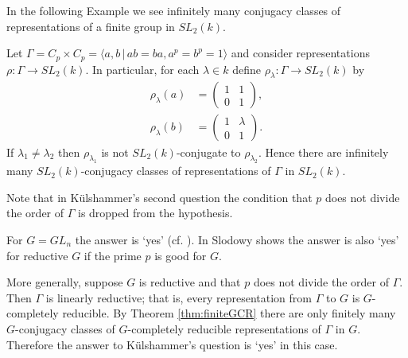 In the following Example we see infinitely many conjugacy classes of representations of a finite group in $SL_2(k)$.
\begin{example}
  Let $\Gamma = C_p \times C_p = \langle a, b \,|\, ab = ba, a^p = b^p = 1 \rangle$ and consider representations $\rho: \Gamma \rightarrow SL_2(k)$. In particular, for each $\lambda \in k$ define $\rho_\lambda: \Gamma \rightarrow SL_2(k)$ by
  \begin{align*}
    \rho_\lambda(a) &= \left( \begin{matrix} 1 & 1 \\ 0 & 1 \end{matrix} \right),\\
    \rho_\lambda(b) &= \left( \begin{matrix} 1 & \lambda \\ 0 & 1 \end{matrix} \right).
  \end{align*}
  If $\lambda_1 \neq \lambda_2$ then $\rho_{\lambda_1}$ is not $SL_2(k)$-conjugate to $\rho_{\lambda_2}$. Hence there are infinitely many $SL_2(k)$-conjugacy classes of representations of $\Gamma$ in $SL_2(k)$.
\end{example}

Note that in K\"ulshammer's second question the condition that $p$ does not divide the order of $\Gamma$ is dropped from the hypothesis.

For $G=GL_n$ the answer is `yes' (cf. \cite[pg. 297]{kulshammer1995donovan}). In \cite{slodowy1997two} Slodowy shows the answer is also `yes' for reductive $G$ if the prime $p$ is good for $G$.


More generally, suppose $G$ is reductive and that $p$ does not divide the order of $\Gamma$. Then $\Gamma$ is linearly reductive; that is, every representation from $\Gamma$ to $G$ is $G$-completely reducible. By Theorem \ref{thm:finiteGCR} there are only finitely many $G$-conjugacy classes of $G$-completely reducible representations of $\Gamma$ in $G$. Therefore the answer to K\"ulshammer's question is `yes' in this case.

